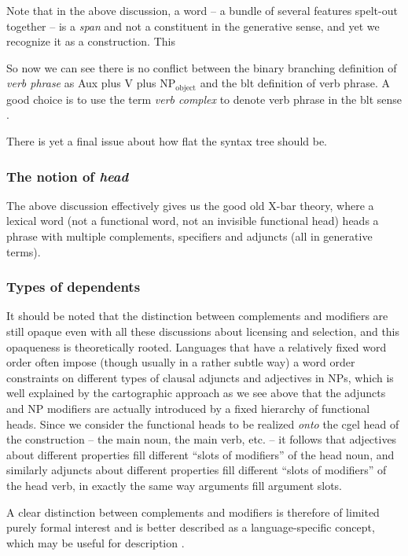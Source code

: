 \documentclass[../main.tex]{subfiles}
\begin{document}
Note that in the above discussion, a word -- a bundle of several features spelt-out together -- is a \emph{span}
and not a constituent in the generative sense, and yet we recognize it as a construction. This %

So now we can see there is no conflict between the binary branching definition of \emph{verb phrase} as Aux plus V plus NP$_\text{object}$ and the \ac{blt} definition of verb phrase. A good choice is to use the term 
\emph{verb complex} to denote verb phrase in the \ac{blt} sense \citep{Wilbur2014}.

There is yet a final issue about how flat the syntax tree should be. %

\subsubsection{The notion of \emph{head}}\label{sec:headedness}

The above discussion effectively gives us the good old X-bar theory, where a lexical word (not a functional word, 
not an invisible functional head) heads a phrase with multiple complements, specifiers and adjuncts (all in 
generative terms).

\subsubsection{Types of dependents}

It should be noted that the distinction between complements and modifiers are still opaque even with 
all these discussions about licensing and selection, and this opaqueness is theoretically rooted. 
Languages that have a relatively fixed word order often impose (though usually in a rather subtle way) 
a word order constraints on different types of clausal adjuncts and adjectives in NPs, 
which is well explained by the cartographic approach as we see above that the adjuncts and NP modifiers 
are actually introduced by a fixed hierarchy of functional heads. Since we consider the functional heads 
to be realized \emph{onto} the \ac{cgel} head of the construction -- the main noun, the main verb, etc. -- 
it follows that adjectives about different properties fill different ``slots of modifiers'' of the head noun, 
and similarly adjuncts about different properties fill different ``slots of modifiers'' of the head verb, 
in exactly the same way arguments fill argument slots. 

A clear distinction between complements and modifiers is therefore of limited purely formal interest and 
is better described as a language-specific concept, which may be useful for description \citep{haspelmath2014arguments}. 
\end{document}
